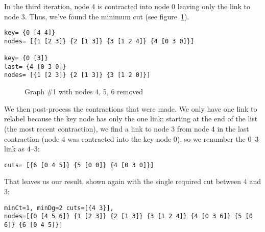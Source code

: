 \documentclass[12pt,notitlepage]{article}
\begin{document}
In the third iteration, node 4 is contracted into node 0 leaving only the link to node 3.
Thus, we've found the minimum cut (see figure~\ref{it3}).
\begin{Verbatim}
key= {0 [4 4]} 
nodes= [{1 [2 3]} {2 [1 3]} {3 [1 2 4]} {4 [0 3 0]}]

key= {0 [3]} 
last= {4 [0 3 0]} 
nodes= [{1 [2 3]} {2 [1 3]} {3 [1 2 0]}]
\end{Verbatim}

\begin{figure}[ht]
\centering
\vspace{0.1in}
\vspace{0.1in}
\caption{Graph \#1 with nodes 4, 5, 6 removed}
\label{it3}
\end{figure}

We then post-process the contractions that were made. We only have one link to 
relabel because the key node has only the one link; starting at the end of the
list (the most recent contraction), we find a link to node 3 from node 4 in the 
last contraction (node 4 was contracted into the key node 0), so we renumber 
the 0--3 link as 4--3:
\begin{Verbatim}
cuts= [{6 [0 4 5]} {5 [0 0]} {4 [0 3 0]}]
\end{Verbatim}

That leaves us our result, shown again with the single required cut between 4 and 3:
\begin{Verbatim}
minCt=1, minDg=2 cuts=[{4 3}], 
nodes=[{0 [4 5 6]} {1 [2 3]} {2 [1 3]} {3 [1 2 4]} {4 [0 3 6]} {5 [0 6]} {6 [0 4 5]}]
\end{Verbatim}
\end{document}
